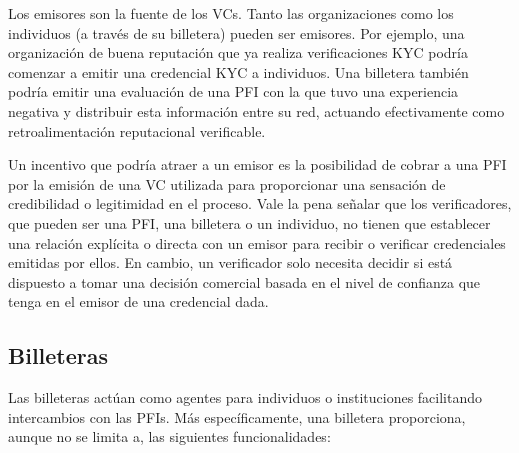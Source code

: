 \documentclass[11pt]{article}
\begin{document}
\vspace{1\baselineskip}
Los emisores son la fuente de los VCs. Tanto las organizaciones como los individuos (a través de su billetera) pueden ser emisores. Por ejemplo, una organización de buena reputación que ya realiza verificaciones KYC podría comenzar a emitir una credencial KYC a individuos. Una billetera también podría emitir una evaluación de una PFI con la que tuvo una experiencia negativa y distribuir esta información entre su red, actuando efectivamente como retroalimentación reputacional verificable.

\vspace{1\baselineskip}
Un incentivo que podría atraer a un emisor es la posibilidad de cobrar a una PFI por la emisión de una VC utilizada para proporcionar una sensación de credibilidad o legitimidad en el proceso. Vale la pena señalar que los verificadores, que pueden ser una PFI, una billetera o un individuo, no tienen que establecer una relación explícita o directa con un emisor para recibir o verificar credenciales emitidas por ellos. En cambio, un verificador solo necesita decidir si está dispuesto a tomar una decisión comercial basada en el nivel de confianza que tenga en el emisor de una credencial dada.

\vspace{1\baselineskip}
\subsection{Billeteras}

\vspace{1\baselineskip}
Las billeteras actúan como agentes para individuos o instituciones facilitando intercambios con las PFIs. Más específicamente, una billetera proporciona, aunque no se limita a, las siguientes funcionalidades:
\end{document}
